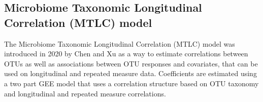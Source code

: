 \documentclass[12pt]{article}
\begin{document}
\begin{singlespace}
  \section{Microbiome Taxonomic Longitudinal Correlation (MTLC) model}
\end{singlespace}


The Microbiome Taxonomic Longitudinal Correlation (MTLC) model was introduced in 2020 by Chen and Xu\cite{chen2020generalized} as a way to estimate correlations between OTUs as well as associations between OTU responses and covariates, that can be used on longitudinal and repeated measure data. Coefficients are estimated using a two part GEE model that uses a correlation structure based on OTU taxonomy and longitudinal and repeated measure correlations.


%

\end{document}
